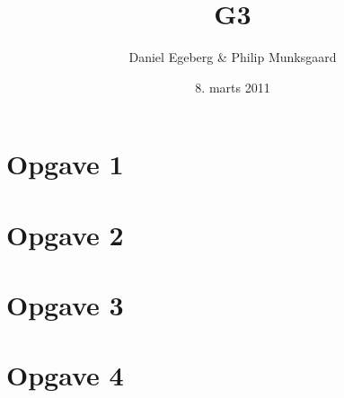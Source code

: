 \documentclass [10pt,a4paper]{article}
\title{G3}
\author{Daniel Egeberg \& Philip Munksgaard}
\date{8. marts 2011}
\begin{document}
\maketitle

\section*{Opgave 1} %


\section*{Opgave 2} %


\section*{Opgave 3} %


\section*{Opgave 4} %

\end{document}
